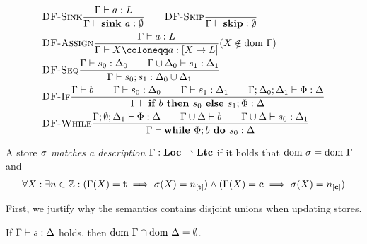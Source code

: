 \begin{align*}
    &\rule{DF-Sink}{\typestep{\Gamma}{a}{L}}{\typestep{\Gamma}{\sink{a}}{\emptyset}}\qquad
    \rule{DF-Skip}{}{\typestep{\Gamma}{\skipcmd}{\emptyset}}\\
    &\rule{DF-Assign}{\typestep{\Gamma}{a}{L}}
    {\typestep{\Gamma}{\defaultstore}{[X \mapsto L]}} \text{($X \notin \dom\Gamma$)}\\
    &\rule{DF-Seq}{\typestep{\Gamma}{s_0}{\Delta_0}\qquad
    \typestep{\Gamma \cup \Delta_0}{s_1}{\Delta_1}}{\typestep{\Gamma}{\defaultssaseq}{\Delta_0 \cup \Delta_1}}\\
    &\rule{DF-If}{\typestmt{\Gamma}{b}\qquad\typestep{\Gamma}{s_0}{\Delta_0}\qquad \typestep{\Gamma}{s_1}{\Delta_1}\qquad
    \typestep{\Gamma;\Delta_0;\Delta_1}{\philist}{\Delta}}
    {\typestep{\Gamma}{\defaultssaif}{\Delta}}\\
    &\rule{DF-While}{\typestep{\Gamma;\emptyset;\Delta_1}{\philist}{\Delta}\qquad
    \typestmt{\Gamma \cup \Delta}{b}\qquad\typestep{\Gamma \cup \Delta}{s_0}{\Delta_1}}
    {\typestep{\Gamma}{\defaultssawhile}{\Delta}}
\end{align*}

\begin{definition}
    A store $\sigma$ \emph{matches a description} $\Gamma: \textbf{Loc} \rightharpoonup \textbf{Ltc}$ if it holds that 
    $\text{dom }{\sigma} = \text{dom }{\Gamma}$ and
    \begin{align*}
        \forall X: \exists n \in \Z: (\Gamma(X) = \ltracked \implies \store(X) = \tracked)
        \land (\Gamma(X) = \lclean \implies \store(X) = \clean)
    \end{align*}
\end{definition}

First, we justify why the semantics contains disjoint unions when updating stores.
\begin{theorem}
    \label{thm:gamma-delta-disjoint}
    If $\Gamma \vdash {s}: \Delta$ holds, then $\text{dom }{\Gamma} \cap \text{dom }{\Delta} = \emptyset$.
\end{theorem}

